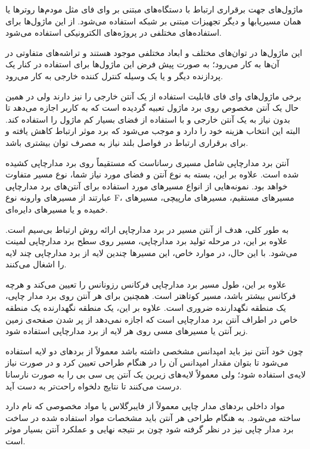 
ماژول‌های  جهت برقراری ارتباط با دستگاه‌های مبتنی بر وای فای مثل مودم‌ها روتر‌ها یا همان مسیریابها و دیگر تجهیزات مبتنی بر شبکه استفاده می‌شود. از این ماژول‌ها برای استفاده‌های مختلفی در پروژه‌های الکترونیکی استفاده می‌شود.

این ماژول‌ها در توان‌های مختلف و ابعاد مختلفی موجود هستند و تراشه‌های متفاوتی در آن‌ها به کار می‌رود؛ به صورت پیش فرض این ماژول‌ها برای استفاده در کنار یک پردازنده دیگر و یا یک وسیله کنترل کننده خارجی به کار می‌رود.

برخی ماژول‌های وای فای قابلیت استفاده از یک آنتن خارجی را نیز دارند ولی در همین حال یک آنتن مخصوص روی برد ماژول تعبیه گردیده است که به کاربر اجازه می‌دهد تا بدون نیاز به یک آنتن خارجی و با استفاده از فضای بسیار کم ماژول را استفاده کند. البته این انتخاب هزینه خود را دارد و موجب می‌شود که برد موثر ارتباط  کاهش یافته و برای برقراری ارتباط در فواصل بلند نیاز به مصرف توان بیشتری باشد.


آنتن برد مدارچاپی شامل مسیری رساناست که مستقیماً روی برد مدارچاپی کشیده شده است. علاوه بر این، بسته به نوع آنتن و فضای مورد نیاز شما، نوع مسیر متفاوت خواهد بود. نمونه‌هایی از انواع مسیر‌های مورد استفاده برای آنتن‌های برد مدارچاپی عبارتند از مسیرهای وارونه نوع F، مسیرهای مستقیم، مسیرهای مارپیچی، مسیرهای خمیده و یا مسیرهای دایره‌ای.

به طور کلی، هدف از آنتن مسیر در برد مدارچاپی ارائه روش ارتباط بی‌سیم است. علاوه بر این، در مرحله تولید برد مدارچاپی، مسیر روی سطح برد مدارچاپی لمینت می‌شود. با این حال، در موارد خاص، این مسیرها چندین لایه از برد مدارچاپی چند لایه را اشغال می‌کنند.

علاوه بر این، طول مسیر برد مدارچاپی فرکانس رزونانس را تعیین می‌کند و هرچه فرکانس بیشتر باشد، مسیر کوتاهتر است. همچنین برای هر آنتن روی برد مدار چاپی، یک منطقه نگهدارنده ضروری است. علاوه بر این، یک منطقه نگهدارنده یک منطقه خاص در اطراف آنتن برد مدارچاپی است که اجازه نمی‌دهد از پر شدن صفحه‌ی زمین زیر آنتن یا مسیرهای مسی روی هر لایه از برد مدارچاپی استفاده شود.

چون خود آنتن نیز باید امپدانس مشخصی داشته باشد معمولاً از بردهای دو لایه استفاده می‌شود تا بتوان مقدار امپدانس آن را در هنگام طراحی تعیین کرد و در صورت نیاز لایه‌ی  استفاده شود؛ ولی معمولاً لایه‌های زیرین یک آنتن پی سی بی را به صورت نارسانا درست می‌کنند تا نتایج دلخواه راحت‌تر به دست آید.

مواد داخلی بردهای مدار چاپی معمولاً از فایبرگلاس یا مواد مخصوصی که  نام دارد ساخته می‌شود. به هنگام طراحی هر آنتن باید مشخصات مواد استفاده شده در ساخت برد مدار چاپی نیز در نظر گرفته شود چون بر نتیجه نهایی و عملکرد آنتن بسیار موثر است.

